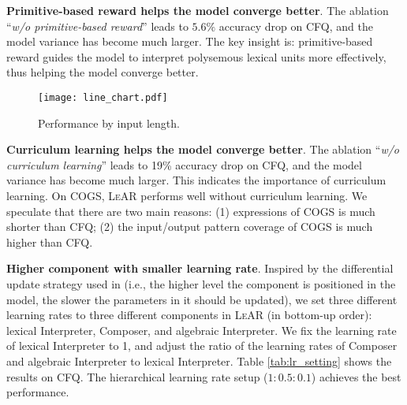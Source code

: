 \documentclass[11pt,a4paper]{article}
\begin{document}
\noindent \textbf{Primitive-based reward helps the model converge better}.
The ablation ``\textit{w/o primitive-based reward}'' leads to $5.6\%$ accuracy drop on CFQ, and the model variance has become much larger.
The key insight is: primitive-based reward guides the model to interpret polysemous lexical units more effectively, thus helping the model converge better.


\begin{table}
\centering
{}
\caption{Results of different learning rate ratios  of lexical Interpreter, Composer, and algebraic Interpreter.}
\label{tab:lr_setting}
\end{table}

\begin{figure}[tp]
  \centering
  \texttt{[image: line\_chart.pdf]}
  \caption{Performance by input length.}
  \label{fig:diff_len}
\end{figure}

\noindent \textbf{Curriculum learning helps the model converge better}.
The ablation ``\emph{w/o curriculum learning}'' leads to 19\% accuracy drop on CFQ, and the model variance has become much larger.
This indicates the importance of curriculum learning.
On COGS, \textsc{LeAR} performs well without curriculum learning.
We speculate that there are two main reasons:
(1) expressions of COGS is much shorter than CFQ;
(2) the input/output pattern coverage of COGS is much higher than CFQ.


\noindent \textbf{Higher component with smaller learning rate}. 
Inspired by the differential update strategy used in \citet{liu2020spstru}(i.e., the higher level the component is positioned in the model, the slower the parameters in it should be updated), we set three different learning rates to three different components in \textsc{LeAR} (in bottom-up order): lexical Interpreter, Composer, and algebraic Interpreter.
We fix the learning rate of lexical Interpreter to 1, and adjust the ratio of the learning rates of Composer and algebraic Interpreter to lexical Interpreter.
Table \ref{tab:lr_setting} shows the results on CFQ.
The hierarchical learning rate setup ($1:0.5:0.1$) achieves the best performance.
\end{document}

